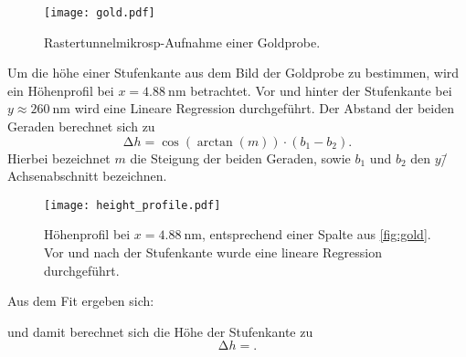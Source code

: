 \begin{figure}
  \centering
  \texttt{[image: gold.pdf]}
  \caption{Rastertunnelmikrosp-Aufnahme einer Goldprobe.}
  \label{fig:gold}
\end{figure}

Um die höhe einer Stufenkante aus dem Bild der Goldprobe zu bestimmen, wird ein Höhenprofil bei $x=\SI{4.88}{\nano\meter}$ betrachtet.
Vor und hinter der Stufenkante bei  $y \approx \SI{260}{\nano\meter}$ wird eine Lineare Regression durchgeführt.
Der Abstand der beiden Geraden berechnet sich zu
\begin{equation}
  \increment h = \cos(\arctan(m)) \cdot (b_1 - b_2).
\end{equation}
Hierbei bezeichnet $m$ die Steigung der beiden Geraden, sowie $b_1$ und $b_2$ den $y$\=/Achsenabschnitt bezeichnen.

\begin{figure}
  \centering
  \texttt{[image: height\_profile.pdf]}
  \caption{%
    Höhenprofil bei $x=\SI{4.88}{\nano\meter}$,
    entsprechend einer Spalte aus \autoref{fig:gold}.
    Vor und nach der Stufenkante wurde eine lineare Regression durchgeführt.}\label{fig:profile}
\end{figure}


Aus dem Fit ergeben sich:

und damit berechnet sich die Höhe der Stufenkante zu
\begin{equation}
  \increment h = .
\end{equation}

